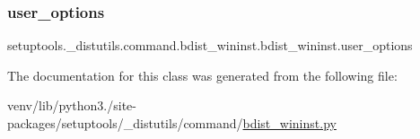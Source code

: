 \subsubsection{\texorpdfstring{user\+\_\+options}{user\_options}}
{\footnotesize\ttfamily setuptools.\+\_\+distutils.\+command.\+bdist\+\_\+wininst.\+bdist\+\_\+wininst.\+user\+\_\+options\hspace{0.3cm}{\ttfamily [static]}}



The documentation for this class was generated from the following file\+:\begin{DoxyCompactItemize}
\item 
venv/lib/python3./site-\/packages/setuptools/\+\_\+distutils/command/\hyperlink{bdist__wininst_8py}{bdist\+\_\+wininst.\+py}\end{DoxyCompactItemize}
